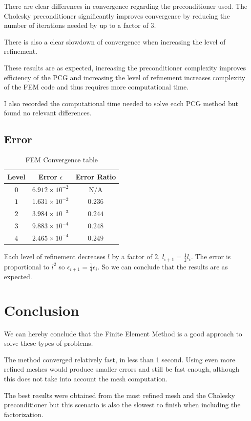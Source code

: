 \documentclass[a4paper, 11pt]{article}
\begin{document}
				There are clear differences in convergence regarding the preconditioner used.
				The Cholesky preconditioner significantly improves convergence by reducing the number of iterations needed by up to a factor of 3.
				
				There is also a clear slowdown of convergence when increasing the level of refinement.
				
				These results are as expected, increasing the preconditioner complexity improves efficiency of the PCG and increasing the level of refinement increases complexity of the FEM code and thus requires more computational time.
						
				I also recorded the computational time needed to solve each PCG method but found no relevant differences.
				
			\subsection{Error}
				\begin{table}[H]
					\centering
					\begin{tabular}{c|c|c}         
						\textbf{Level} 	& \textbf{ Error $ \epsilon $} 		& \textbf{Error Ratio}  \\ \hline
						$ 0  $			& $ 6.912 \times 10^{-2} $ 	& N/A \\ \hline
						$ 1  $			& $ 1.631 \times 10^{-2} $ 	& $ 0.236 $ \\ \hline
						$ 2  $			& $ 3.984 \times 10^{-3} $ 	& $ 0.244 $ \\ \hline
						$ 3  $			& $ 9.883 \times 10^{-4} $	& $ 0.248 $ \\ \hline
						$ 4  $			& $ 2.465 \times 10^{-4} $ 	& $ 0.249 $ \\ 
					\end{tabular}
					\caption{FEM Convergence table}
					\label{table:errors}
				\end{table}
				Each level of refinement decreases $ l $ by a factor of $ 2 $, $ l_{i+1} = \frac{1}{2}l_i $.
				The error is proportional to $l^2$ so $ \epsilon_{i+1} = \frac{1}{4}\epsilon_i $.
				So we can conclude that the results are as expected.
			
			\pagebreak
			\section{Conclusion}
				We can hereby conclude that the Finite Element Method is a good approach to solve these types of problems.
				
				The method converged relatively fast, in less than 1 second.
				Using even more refined meshes would produce smaller errors and still be fast enough, although this does not take into account the mesh computation.
				
				The best results were obtained from the most refined mesh and the Cholesky preconditioner but this scenario is also the slowest to finish when including the factorization.
	
	
\end{document}
